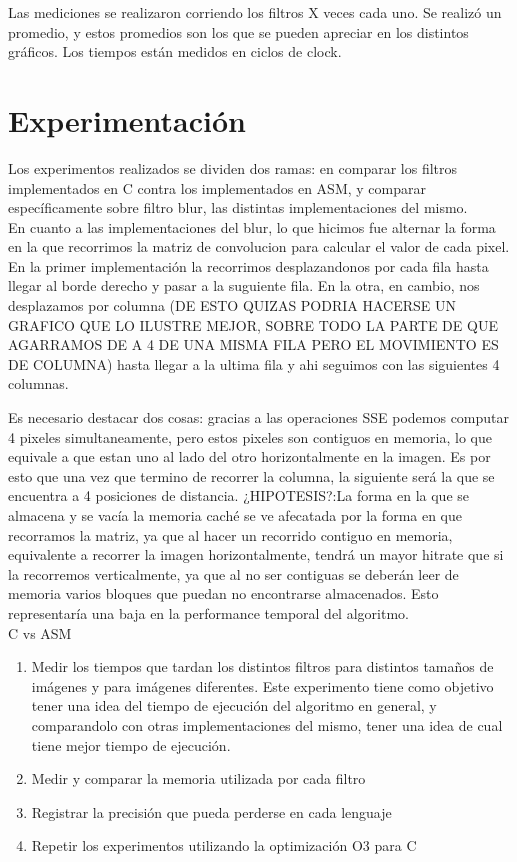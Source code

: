 \documentclass[10pt,a4paper,spanish]{article}
\begin{document}
Las mediciones se realizaron corriendo los filtros X veces cada uno. Se realizó un promedio, y estos promedios son los que se pueden apreciar en los distintos gráficos. Los tiempos están medidos en ciclos de clock.

\section{Experimentación}

Los experimentos realizados se dividen dos ramas: en comparar los filtros implementados en C contra los implementados en ASM, y comparar específicamente sobre filtro blur, las distintas implementaciones del mismo. \\

En cuanto a las implementaciones del blur, lo que hicimos fue alternar la forma en la que recorrimos la matriz de convolucion para calcular el valor de cada pixel. En la primer implementación la recorrimos desplazandonos por cada fila hasta llegar al borde derecho y pasar a la suguiente fila. En la otra, en cambio, nos desplazamos por columna (DE ESTO QUIZAS PODRIA HACERSE UN GRAFICO QUE LO ILUSTRE MEJOR, SOBRE TODO LA PARTE DE QUE AGARRAMOS DE A 4 DE UNA MISMA FILA PERO EL MOVIMIENTO ES DE COLUMNA) hasta llegar a la ultima fila y ahi seguimos con las siguientes 4 columnas.

Es necesario destacar dos cosas: gracias a las operaciones SSE podemos computar 4 pixeles simultaneamente, pero estos pixeles son contiguos en memoria, lo que equivale a que estan uno al lado del otro horizontalmente en la imagen. Es por esto que una vez que termino de recorrer la columna, la siguiente será la que se encuentra a 4 posiciones de distancia.
¿HIPOTESIS?:La forma en la que se almacena y se vacía la memoria caché se ve afecatada por la forma en que recorramos la matriz, ya que al hacer un recorrido contiguo en memoria, equivalente a recorrer la imagen horizontalmente, tendrá un mayor hitrate que si la recorremos verticalmente, ya que al no ser contiguas se deberán leer de memoria varios bloques que puedan no encontrarse almacenados. Esto representaría una baja en la performance temporal del algoritmo. \\

C vs ASM

\begin{enumerate}
	\item Medir los tiempos que tardan los distintos filtros para distintos tamaños de imágenes y para imágenes diferentes. Este experimento tiene como objetivo tener una idea del tiempo de ejecución del algoritmo en general, y comparandolo con otras implementaciones del mismo, tener una idea de cual tiene mejor tiempo de ejecución.
	\item Medir y comparar la memoria utilizada por cada filtro
	\item Registrar la precisión que pueda perderse en cada lenguaje
	\item Repetir los experimentos utilizando la optimización O3 para C
\end{enumerate}
\end{document}
